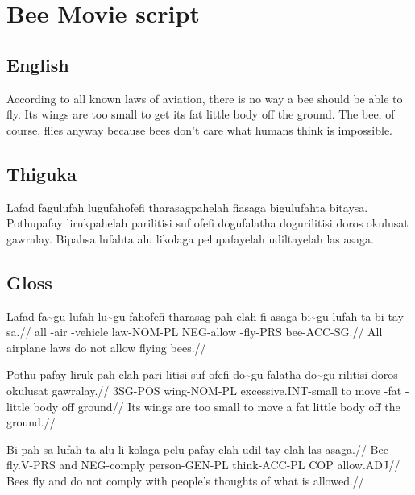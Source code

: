 
\section{Bee Movie script}

\subsection*{English}
According to all known laws of aviation, there is no way a bee should be able to fly.
Its wings are too small to get its fat little body off the ground.
The bee, of course, flies anyway because bees don't care what humans think is impossible.

\subsection*{Thiguka}
Lafad fagulufah lugufahofefi tharasagpahelah fiasaga bigulufahta bitaysa.
Pothupafay lirukpahelah parilitisi suf ofefi dogufalatha dogurilitisi doros okulusat gawralay.
Bipahsa lufahta alu likolaga pelupafayelah udiltayelah las asaga.

\subsection*{Gloss}
\ex
\begingl
\gla  Lafad fa\~{}gu-lufah lu\~{}gu-fahofefi tharasag-pah-elah fi-asaga bi\~{}gu-lufah-ta bi-tay-sa.//
\glb  all \agradj-air \agradj-vehicle law-NOM-PL NEG-allow \agradj-fly-PRS bee-ACC-SG.//
\glft All airplane laws do not allow flying bees.//
\endgl
\xe

\ex
\begingl
\gla  Pothu-pafay liruk-pah-elah  pari-litisi suf ofefi  do\~{}gu-falatha do\~{}gu-rilitisi doros okulusat gawralay.//
\glb  3SG-POS wing-NOM-PL  excessive.INT-small to move  \agradj-fat \agradj-little body off ground//
\glft Its wings are too small to move a fat little body off the ground.//
\endgl
\xe

\ex
\begingl
\gla  Bi-pah-sa lufah-ta alu li-kolaga pelu-pafay-elah udil-tay-elah las asaga.//
\glb  Bee fly.V-PRS and NEG-comply person-GEN-PL think-ACC-PL COP allow.ADJ//
\glft Bees fly and do not comply with people's thoughts of what is allowed.//
\endgl
\xe


